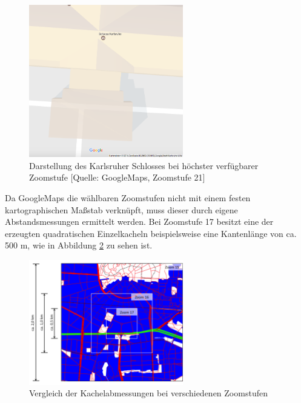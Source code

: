 \begin{figure}
  \centering
    \includegraphics[width=0.6\textwidth]{images/3_KA_Schloss_zoom21.png}
    \caption{Darstellung des Karlsruher Schlosses bei höchster verfügbarer Zoomstufe [Quelle: GoogleMaps, Zoomstufe 21]}
    \label{fig:Schloss_KA}
\end{figure}

Da GoogleMaps die wählbaren Zoomstufen nicht mit einem festen kartographischen Maßstab verknüpft, muss dieser durch eigene Abstandsmessungen ermittelt werden. Bei Zoomstufe 17 besitzt eine der erzeugten quadratischen Einzelkacheln beispielsweise eine Kantenlänge von ca. \num{500} \si{\metre}, wie in Abbildung \ref{fig:Zoomvgl} zu sehen ist.\\

\begin{figure}
  \centering
    \includegraphics[width=0.6\textwidth]{images/3_Zoomvergleich_KA.png}
    \caption{Vergleich der Kachelabmessungen bei verschiedenen Zoomstufen}
    \label{fig:Zoomvgl}
\end{figure}

